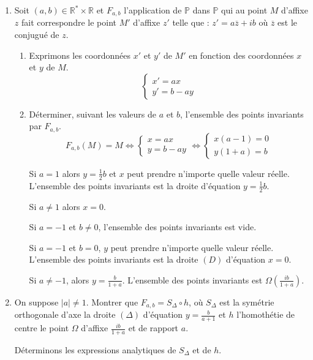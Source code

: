 \documentclass[12pt,a4paper]{article}
\begin{document}
\begin{enumerate}
\item Soit $(a, b) \in \mathbb{R}^* \times \mathbb{R}$ et $F_{a,b}$ l’application de $\mathbb{P}$ dans $\mathbb{P}$ qui au point $M$ d’affixe $z$ fait correspondre le point $M'$ d’affixe $z'$ telle que : $z' = a \overline{z} + ib$ où $\overline{z}$ est le conjugué de $z$.
\begin{enumerate}
\item Exprimons les coordonnées $x'$ et $y'$ de $M'$ en fonction des coordonnées $x$ et $y$ de $M$.
\[
\begin{cases}
x' = a x \\
y' = b - a y
\end{cases}
\]
\item Déterminer, suivant les valeurs de $a$ et $b$, l’ensemble des points invariants par $F_{a,b}$.
\[ F_{a,b}(M) = M \Leftrightarrow 
\begin{cases} 
x = a x \\ 
y = b - a y 
\end{cases}
\Leftrightarrow 
\begin{cases} 
x(a - 1) = 0 \\ 
y(1 + a) = b 
\end{cases} \]

     Si $a = 1$ alors $y = \frac{1}{2} b$ et $x$ peut prendre n’importe quelle valeur réelle. L’ensemble des points invariants est la droite d’équation $y = \frac{1}{2} b$.
     
     Si $a \neq 1$ alors $x = 0$.
    
         Si $a = -1$ et $b \neq 0$, l’ensemble des points invariants est vide.
         
         Si $a = -1$ et $b = 0$, $y$ peut prendre n’importe quelle valeur réelle. L’ensemble des points invariants est la droite $(D)$ d’équation $x = 0$.
         
         Si $a \neq -1$, alors $y = \frac{b}{1 + a}$. L’ensemble des points invariants est $\Omega \left( \frac{ib}{1 + a} \right)$.
\end{enumerate}
\item On suppose $|a| \neq 1$. Montrer que $F_{a,b} = S_\Delta \circ h$, où $S_\Delta$ est la symétrie orthogonale d’axe la droite $(\Delta)$ d’équation $y = \frac{b}{a + 1}$ et $h$ l’homothétie de centre le point $\Omega$ d’affixe $\frac{ib}{1 + a}$ et de rapport $a$.

Déterminons les expressions analytiques de $S_\Delta$ et de $h$.


\end{enumerate}
\end{document}
